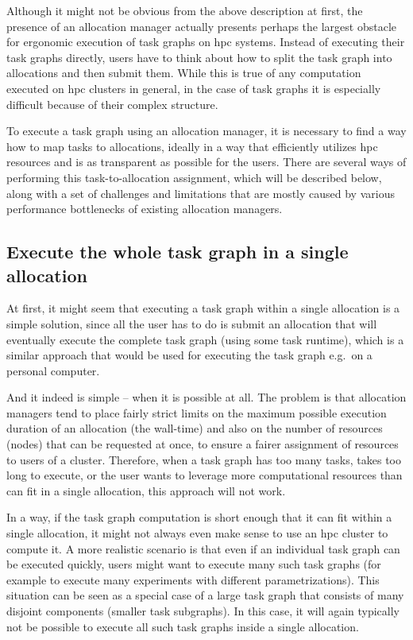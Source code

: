 Although it might not be obvious from the above description at first, the presence of an allocation
manager actually presents perhaps the largest obstacle for ergonomic execution of task graphs on
\gls{hpc} systems. Instead of executing their task graphs directly, users have to
think about how to split the task graph into allocations and then submit them. While this is true
of any computation executed on \gls{hpc} clusters in general, in the case of task
graphs it is especially difficult because of their complex structure.

To execute a task graph using an allocation manager, it is necessary to find a way how to map tasks
to allocations, ideally in a way that efficiently utilizes \gls{hpc} resources and
is as transparent as possible for the users. There are several ways of performing this
task-to-allocation assignment, which will be described below, along with a set of challenges and
limitations that are mostly caused by various performance bottlenecks of existing allocation
managers.

\subsection*{Execute the whole task graph in a single allocation}
At first, it might seem that executing a task graph within a single allocation is a simple
solution, since all the user has to do is submit an allocation that will eventually execute the
complete task graph (using some task runtime), which is a similar approach that would be used for
executing the task graph e.g.\ on a personal computer.

And it indeed is simple -- when it is possible at all. The problem is that allocation managers tend
to place fairly strict limits on the maximum possible execution duration of an allocation (the
wall-time) and also on the number of resources (nodes) that can be requested at once, to ensure a
fairer assignment of resources to users of a cluster. Therefore, when a task graph has too many
tasks, takes too long to execute, or the user wants to leverage more computational resources than
can fit in a single allocation, this approach will not work.

In a way, if the task graph computation is short enough that it can fit within a single allocation,
it might not always even make sense to use an \gls{hpc} cluster to compute it. A
more realistic scenario is that even if an individual task graph can be executed quickly, users
might want to execute many such task graphs (for example to execute many experiments with different
parametrizations). This situation can be seen as a special case of a large task graph that consists
of many disjoint components (smaller task subgraphs). In this case, it will again typically not be
possible to execute all such task graphs inside a single allocation.

